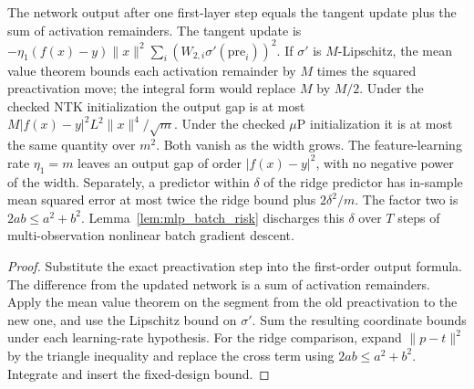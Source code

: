 \begin{lemma}\label{lem:tangent_step}
\leanok
{}
The network output after one first-layer step equals the tangent update plus the sum of activation remainders. The tangent update is $- \eta_1 (f(x)-y) \|x\|^2 \sum_i (W_{2,i}\sigma'(\mathrm{pre}_i))^2$. If $\sigma'$ is $M$-Lipschitz, the mean value theorem bounds each activation remainder by $M$ times the squared preactivation move; the integral form would replace $M$ by $M/2$. Under the checked NTK initialization the output gap is at most $M |f(x)-y|^2 L^2 \|x\|^4 / \sqrt{m}$. Under the checked $\mu$P initialization it is at most the same quantity over $m^2$. Both vanish as the width grows. The feature-learning rate $\eta_1=m$ leaves an output gap of order $|f(x)-y|^2$, with no negative power of the width. Separately, a predictor within $\delta$ of the ridge predictor has in-sample mean squared error at most twice the ridge bound plus $2\delta^2/m$. The factor two is $2ab\le a^2+b^2$. Lemma~\ref{lem:mlp_batch_risk} discharges this $\delta$ over $T$ steps of multi-observation nonlinear batch gradient descent.
\end{lemma}
\begin{proof}
\leanok
Substitute the exact preactivation step into the first-order output formula. The difference from the updated network is a sum of activation remainders. Apply the mean value theorem on the segment from the old preactivation to the new one, and use the Lipschitz bound on $\sigma'$. Sum the resulting coordinate bounds under each learning-rate hypothesis. For the ridge comparison, expand $\|p-t\|^2$ by the triangle inequality and replace the cross term using $2ab\le a^2+b^2$. Integrate and insert the fixed-design bound.
\end{proof}

